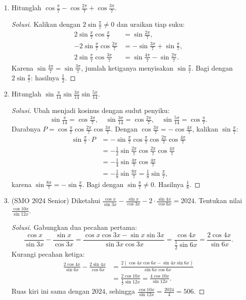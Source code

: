 \documentclass[12pt]{scrartcl}
\begin{document}
\begin{enumerate}
	\item
	Hitunglah $\cos\frac{\pi}{7} - \cos\frac{2\pi}{7} + \cos\frac{3\pi}{7}$.
	\begin{proof}[Solusi]
	Kalikan dengan $2\sin\frac{\pi}{7} \ne 0$ dan uraikan tiap suku:
	\begin{align*}
	2\sin\tfrac{\pi}{7}\cos\tfrac{\pi}{7} &= \sin\tfrac{2\pi}{7}, \\
	-2\sin\tfrac{\pi}{7}\cos\tfrac{2\pi}{7}
	&= -\sin\tfrac{3\pi}{7} + \sin\tfrac{\pi}{7}, \\
	2\sin\tfrac{\pi}{7}\cos\tfrac{3\pi}{7}
	&= \sin\tfrac{4\pi}{7} - \sin\tfrac{2\pi}{7}.
	\end{align*}
	Karena $\sin\frac{4\pi}{7} = \sin\frac{3\pi}{7}$, jumlah ketiganya
	menyisakan $\sin\frac{\pi}{7}$. Bagi dengan $2\sin\frac{\pi}{7}$:
	hasilnya $\frac12$.
	\end{proof}

	\item
	Hitunglah $\sin\frac{\pi}{14}\sin\frac{3\pi}{14}\sin\frac{5\pi}{14}$.
	\begin{proof}[Solusi]
	Ubah menjadi kosinus dengan sudut penyiku:
	\[ \sin\tfrac{\pi}{14} = \cos\tfrac{3\pi}{7}, \quad
	\sin\tfrac{3\pi}{14} = \cos\tfrac{2\pi}{7}, \quad
	\sin\tfrac{5\pi}{14} = \cos\tfrac{\pi}{7}. \]
	Darabnya $P = \cos\frac{\pi}{7}\cos\frac{2\pi}{7}\cos\frac{3\pi}{7}$.
	Dengan $\cos\frac{3\pi}{7} = -\cos\frac{4\pi}{7}$, kalikan $\sin\frac{\pi}{7}$:
	\begin{align*}
	\sin\tfrac{\pi}{7} \cdot P
	&= -\sin\tfrac{\pi}{7}\cos\tfrac{\pi}{7}\cos\tfrac{2\pi}{7}\cos\tfrac{4\pi}{7} \\
	&= -\tfrac12\sin\tfrac{2\pi}{7}\cos\tfrac{2\pi}{7}\cos\tfrac{4\pi}{7} \\
	&= -\tfrac14\sin\tfrac{4\pi}{7}\cos\tfrac{4\pi}{7} \\
	&= -\tfrac18\sin\tfrac{8\pi}{7} = \tfrac18\sin\tfrac{\pi}{7},
	\end{align*}
	karena $\sin\frac{8\pi}{7} = -\sin\frac{\pi}{7}$.
	Bagi dengan $\sin\frac{\pi}{7} \ne 0$. Hasilnya $\frac18$.
	\end{proof}

	\item (SMO 2024 Senior)
	Diketahui $\frac{\cos x}{\sin 3x} - \frac{\sin x}{\cos 3x}
	- 2\cdot\frac{\sin 4x}{\cos 6x} = 2024$.
	Tentukan nilai $\frac{\cos 10x}{\sin 12x}$.
	\begin{proof}[Solusi]
	Gabungkan dua pecahan pertama:
	\[ \frac{\cos x}{\sin 3x} - \frac{\sin x}{\cos 3x}
	= \frac{\cos x\cos 3x - \sin x\sin 3x}{\sin 3x\cos 3x}
	= \frac{\cos 4x}{\frac12\sin 6x} = \frac{2\cos 4x}{\sin 6x}. \]
	Kurangi pecahan ketiga:
	\begin{align*}
	\frac{2\cos 4x}{\sin 6x} - \frac{2\sin 4x}{\cos 6x}
	&= \frac{2(\cos 4x\cos 6x - \sin 4x\sin 6x)}{\sin 6x\cos 6x} \\
	&= \frac{2\cos 10x}{\frac12\sin 12x}
	= \frac{4\cos 10x}{\sin 12x}.
	\end{align*}
	Ruas kiri ini sama dengan $2024$, sehingga
	$\frac{\cos 10x}{\sin 12x} = \frac{2024}{4} = 506$.
	\end{proof}

\end{enumerate}
\end{document}
